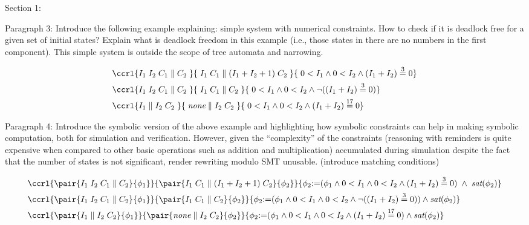 Section 1:

Paragraph 3: Introduce the following example explaining: simple system
with numerical constraints. How to check if it is deadlock free for a
given set of initial states? Explain what is deadlock freedom in this
example (i.e., those states in there are no numbers in the first
component). This simple system is outside the scope of tree automata
and narrowing.

{\small\begin{align*}
  &\ccrl{I_1\;I_2\;C_1 \parallel C_2 \;}{\;I_1 \; C_1 \parallel (I_1 + I_2 + 1)\;C_2 \;}{\;0 < I_1 \land 0< I_2 \land (I_1 + I_2) \stackrel{3}{=} 0} \\
  &\ccrl{I_1\;I_2\;C_1 \parallel C_2 \;}{\;I_1\;C_1 \parallel C_2\;}{\;0 < I_1 \land 0< I_2 \land \neg((I_1 + I_2) \stackrel{3}{=} 0)} \\
  &\ccrl{I_1 \parallel I_2\;C_2 \;}{\;\textit{none} \parallel I_2 \;C_2 \;}{\;0 < I_1 \land 0< I_2 \land (I_1 + I_2) \stackrel{17}{=} 0} \\
\end{align*}}

Paragraph 4: Introduce the symbolic version of the above example and
highlighting how symbolic constraints can help in making symbolic
computation, both for simulation and verification. However, given the
``complexity'' of the constraints (reasoning with reminders is quite
expensive when compared to other basic operations such as addition and
multiplication) accumulated during simulation despite the fact that
the number of states is not significant, render rewriting modulo SMT
unusable. (introduce matching conditions)

{\small\begin{align*}
  &\ccrl{\pair{I_1\;I_2\;C_1 \parallel C_2}{\phi_1}}{\pair{I_1 \; C_1 \parallel (I_1 + I_2 + 1)\;C_2}{\phi_2}}{\phi_2 {:=} (\phi_1 \land 0 < I_1 \land 0< I_2 \land (I_1 + I_2) \stackrel{3}{=} 0) \; \land \; \textit{sat}(\phi_2)} \\
  &\ccrl{\pair{I_1\;I_2\;C_1 \parallel C_2}{\phi_1}}{\pair{I_1\;C_1 \parallel C_2}{\phi_2}}{\phi_2 {:=} (\phi_1 \land 0 < I_1 \land 0< I_2 \land \neg((I_1 + I_2) \stackrel{3}{=} 0)) \land \textit{sat}(\phi_2)} \\
  &\ccrl{\pair{I_1 \parallel I_2\;C_2}{\phi_1}}{\pair{\textit{none} \parallel I_2 \;C_2}{\phi_2}}{\phi_2 {:=} (\phi_1 \land 0 < I_1 \land 0< I_2 \land (I_1 + I_2) \stackrel{17}{=} 0) \land \textit{sat}(\phi_2)} \\
\end{align*}}

